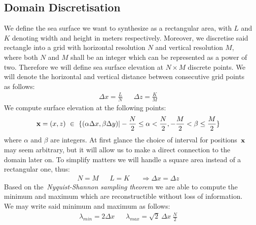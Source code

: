 \subsection{Domain Discretisation}
\label{sec:domain_discretisation}
%
We define the sea surface we want to synthesize as a rectangular area, with $L$
and $K$ denoting width and height in meters respectively. Moreover, we
discretise said rectangle into a grid with horizontal resolution $N$ and
vertical resolution $M$, where both $N$ and $M$ shall be an integer which can
be represented as a power of two. Therefore we will define sea surface elevation 
at $N\times M$ discrete points. We will denote the horizontal and vertical
distance between consecutive grid points as follows:
\begin{align*}
 \Delta x = \frac{L}{N} && \Delta z = \frac{K}{M}
\end{align*}
We compute surface elevation at the following points:
\begin{equation}
\label{eq:spatial_domain}
 \mathbf{x} = (x,z)~\in~\{(\alpha\Delta x,\beta\Delta y)|
-\frac{N}{2}\leq\alpha<\frac{N}{2},-\frac{M}{2}<\beta\leq\frac{M}{2}\}
\end{equation}
where $\alpha$ and $\beta$ are integers. At first glance the choice of interval
for positions~$\mathbf{x}$ may seem arbitrary, but it will allow us to make a
direct connection to the \wavevector domain later on.
To simplify matters we will handle a square area instead of a rectangular one,
thus:
\begin{align*}
 N = M && L = K &&\Rightarrow \Delta x = \Delta z
\end{align*}
%
Based on the~\emph{Nyquist-Shannon sampling
theorem} \citep{book:bracewell2000fourier} we are able to compute the minimum and
maximum \wavelengths which are reconstructible without loss of information.
We may write said minimum and maximum \wavelengths as follows:
\begin{align*}
 \lambda_{min} = 2\Delta x && \lambda_{max} = \sqrt{2}~\Delta x~\frac{N}{2}
\end{align*}
%
%
